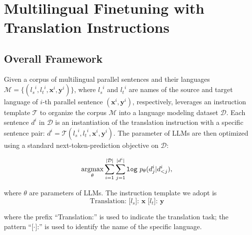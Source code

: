 \section{Multilingual Finetuning with Translation Instructions}
\label{sec:background}


\subsection{Overall Framework}

Given a corpus of multilingual parallel sentences and their languages $\mathcal{M} = \{({l_s}^i, {l_t}^i, \mathbf{x}^i, \mathbf{y}^i) \}$, where ${l_s}^i$ and ${l_t}^i$ are names of the source and target language of $i$-th parallel sentence $(\mathbf{x}^i, \mathbf{y}^i)$, respectively, \method leverages an instruction template $\mathcal{T}$ to organize the corpus $\mathcal{M}$ into a language modeling dataset $\mathcal{D}$. Each sentence $d^i$ in $\mathcal{D}$ is an instantiation of the translation instruction with a specific sentence pair: ${d}^i = \mathcal{T}({l_s}^i, {l_t}^i, \mathbf{x}^i, \mathbf{y}^i)$. The parameter of LLMs are then optimized using a standard next-token-prediction objective on $\mathcal{D}$:

\begin{equation}
    \underset{\theta}{\operatorname*{argmax}}  \sum_{i=1}^{|\mathcal{D}|} \sum_{j=1}^{|{d}^i|} \texttt{log}\ p_{\theta}( {d}_j^i | {d}_{<j}^i),
\end{equation}

\noindent where $\theta$ are parameters of LLMs. The instruction template we adopt is 
\begin{equation*}
    \text{Translation: [}{l_s}\text{]: }\mathbf{x}\text{ [}{l_t}\text{]: }\mathbf{y}
\end{equation*}

\noindent where the prefix ``Translation:'' is used to indicate the translation task; the pattern ``[$\cdot$]:'' is used to identify the name of the specific language. 
